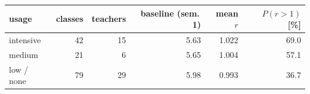 \begin{tabular}{lrrrrr}
\toprule
usage & classes & teachers & baseline (sem.\,1) & mean $r$ & $P(r>1)$ [\%] \\
\midrule
intensive & 42 & 15 & 5.63 & 1.022 & 69.0 \\
medium & 21 & 6 & 5.65 & 1.004 & 57.1 \\
low / none & 79 & 29 & 5.98 & 0.993 & 36.7 \\
\bottomrule
\end{tabular}
